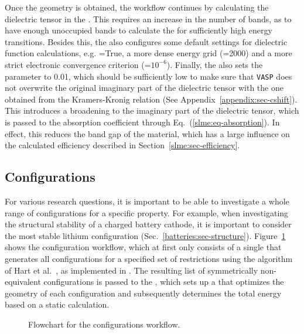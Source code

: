 \begin{refsection}
Once the geometry is obtained, the workflow continues by calculating the dielectric tensor in the . This requires an increase in the number of bands, as to have enough unoccupied bands to calculate the  for sufficiently high energy transitions. Besides this, the  also configures some default settings for dielectric function calculations, e.g. =True, a more dense energy grid (=2000) and a more strict electronic convergence criterion (=$10^{-6}$). Finally, the  also sets the  parameter to 0.01, which should be sufficiently low to make sure that \texttt{VASP} does not overwrite the original imaginary part of the dielectric tensor with the one obtained from the Kramers-Kronig relation (See Appendix~\ref{appendix:sec-cshift}). This introduces a broadening to the imaginary part of the dielectric tensor, which is passed to the absorption coefficient through Eq.~(\ref{slme:eq-absorption}). In effect, this reduces the band gap of the material, which has a large influence on the calculated efficiency described in Section~\ref{slme:sec-efficiency}.

\subsection{Configurations} \label{automation:sec-configurations}

For various research questions, it is important to be able to investigate a whole range of configurations for a specific property. For example, when investigating the structural stability of a charged battery cathode, it is important to consider the most stable lithium configuration (Sec.~\ref{batteries:sec-structure}). Figure~\ref{automation:fig-configurations} shows the configuration workflow, which at first only consists of a single  that generates all configurations for a specified set of restrictions using the algorithm of Hart et al.~\cite{Hart2005}, as implemented in . The resulting list of symmetrically non-equivalent configurations is passed to the , which sets up a  that optimizes the geometry of each configuration and subsequently determines the total energy based on a static calculation.

\begin{figure}[ht]
\centering

\caption{\label{automation:fig-configurations} Flowchart for the configurations workflow.}
\end{figure}


\end{refsection}
